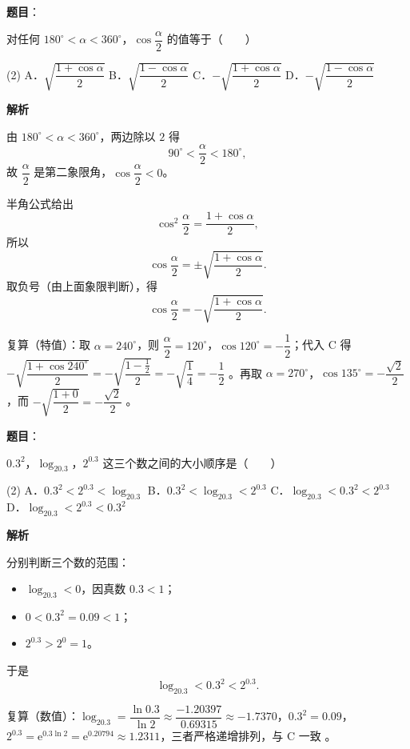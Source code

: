 \begin{answer}

\textbf{题目}：

对任何 $180^\circ<\alpha<360^\circ$，$\cos\dfrac{\alpha}{2}$ 的值等于\mbox{（　　）}

\begin{gkopts}(2)
\task A．$\sqrt{\dfrac{1+\cos\alpha}{2}}$
\task B．$\sqrt{\dfrac{1-\cos\alpha}{2}}$
\task C．$-\sqrt{\dfrac{1+\cos\alpha}{2}}$
\task D．$-\sqrt{\dfrac{1-\cos\alpha}{2}}$
\end{gkopts}

\textbf{解析}

由 $180^\circ<\alpha<360^\circ$，两边除以 $2$ 得
\nopagebreak[4]
\[
90^\circ<\frac\alpha2<180^\circ,
\]
故 $\dfrac\alpha2$ 是第二象限角，$\cos\dfrac\alpha2<0$。

半角公式给出
\nopagebreak[4]
\[
\cos^2\frac\alpha2=\frac{1+\cos\alpha}{2},
\]
所以
\nopagebreak[4]
\[
\cos\frac\alpha2=\pm\sqrt{\frac{1+\cos\alpha}{2}}.
\]
取负号（由上面象限判断），得
\nopagebreak[4]
\[
\cos\frac\alpha2=-\sqrt{\frac{1+\cos\alpha}{2}}.
\]

复算（特值）：取 $\alpha=240^\circ$，则 $\dfrac\alpha2=120^\circ$，$\cos120^\circ=-\dfrac12$；代入 C 得 $-\sqrt{\dfrac{1+\cos240^\circ}{2}}=-\sqrt{\dfrac{1-\frac12}{2}}=-\sqrt{\dfrac14}=-\dfrac12$ 。再取 $\alpha=270^\circ$，$\cos135^\circ=-\dfrac{\sqrt2}{2}$，而 $-\sqrt{\dfrac{1+0}{2}}=-\dfrac{\sqrt2}{2}$ 。


\end{answer}
\begin{answer}

\textbf{题目}：

$0.3^2$，$\log_20.3$，$2^{0.3}$ 这三个数之间的大小顺序是\mbox{（　　）}

\begin{gkopts}(2)
\task A．$0.3^2<2^{0.3}<\log_20.3$
\task B．$0.3^2<\log_20.3<2^{0.3}$
\task C．$\log_20.3<0.3^2<2^{0.3}$
\task D．$\log_20.3<2^{0.3}<0.3^2$
\end{gkopts}

\textbf{解析}

分别判断三个数的范围：

\begin{itemize}
\item $\log_20.3<0$，因真数 $0.3<1$；
\item $0<0.3^2=0.09<1$；
\item $2^{0.3}>2^0=1$。
\end{itemize}

于是
\nopagebreak[4]
\[
\log_20.3<0.3^2<2^{0.3}.
\]

复算（数值）：$\log_20.3=\dfrac{\ln0.3}{\ln2}\approx\dfrac{-1.20397}{0.69315}\approx-1.7370$，$0.3^2=0.09$，$2^{0.3}=\mathrm e^{0.3\ln2}=\mathrm e^{0.20794}\approx1.2311$，三者严格递增排列，与 C 一致 。


\end{answer}

